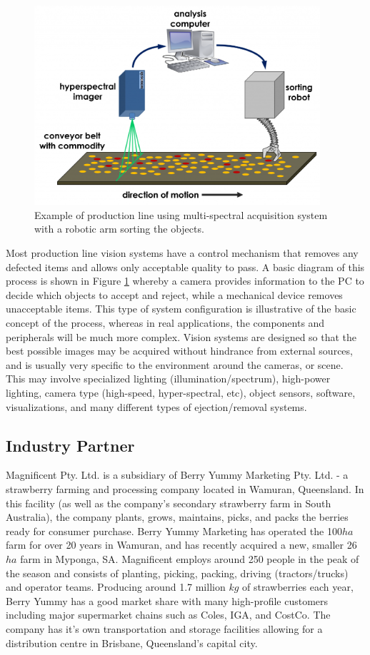 \documentclass[fleqn,twoside]{article}
\begin{document}
\begin{figure}[ht]
	\centering
	\includegraphics[width=300pt]{images/machine_vision.png}
	\caption{Example of production line using multi-spectral acquisition system with a robotic arm sorting the objects.}
	\label{fig:machine_vision}
\end{figure}

Most production line vision systems have a control mechanism that removes any defected items and allows only acceptable quality to pass. A basic diagram of this process is shown in Figure \ref{fig:machine_vision} whereby a camera provides information to the PC to decide which objects to accept and reject, while a mechanical device removes unacceptable items. This type of system configuration is illustrative of the basic concept of the process, whereas in real applications, the components and peripherals will be much more complex. Vision systems are designed so that the best possible images may be acquired without hindrance from external sources, and is usually very specific to the environment around the cameras, or scene. This may involve specialized lighting (illumination/spectrum), high-power lighting, camera type (high-speed, hyper-spectral, etc), object sensors, software, visualizations, and many different types of ejection/removal systems.



\subsection{Industry Partner}

Magnificent Pty. Ltd. is a subsidiary of Berry Yummy Marketing Pty. Ltd. - a strawberry farming and processing company located in Wamuran, Queensland. In this facility (as well as the company's secondary strawberry farm in South Australia), the company plants, grows, maintains, picks, and packs the berries ready for consumer purchase. Berry Yummy Marketing has operated the 100$ha$ farm for over 20 years in Wamuran, and has recently acquired a new, smaller 26$ha$ farm in Myponga, SA. Magnificent employs around 250 people in the peak of the season and consists of planting, picking, packing, driving (tractors/trucks) and operator teams. Producing around 1.7 million $kg$ of strawberries each year, Berry Yummy has a good market share with many high-profile customers including major supermarket chains such as Coles, IGA, and CostCo. The company has it's own transportation and storage facilities allowing for a distribution centre in Brisbane, Queensland's capital city. 
\end{document}
